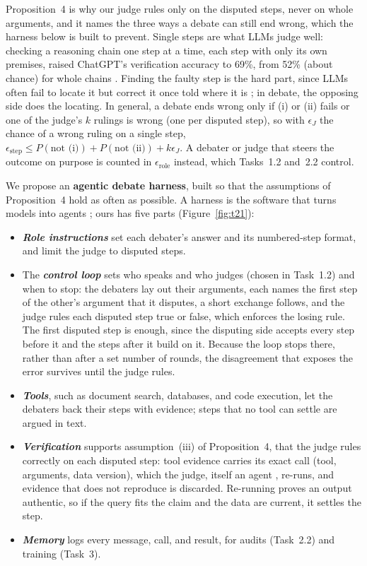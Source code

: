 \documentclass[12pt,letterpaper]{article}
\newcommand{\slab}[1]{\textbf{\textit{#1}}}
\begin{document}
Proposition~4 is why our judge rules only on the disputed steps, never on whole arguments, and it names the three ways a debate can still end wrong, which the harness below is built to prevent. Single steps are what LLMs judge well: checking a reasoning chain one step at a time, each step with only its own premises, raised ChatGPT's verification accuracy to 69\%, from 52\% (about chance) for whole chains \citep{ling2023deductive}. Finding the faulty step is the hard part, since LLMs often fail to locate it but correct it once told where it is \citep{tyen2024llms}; in debate, the opposing side does the locating. In general, a debate ends wrong only if (i) or (ii) fails or one of the judge's $k$ rulings is wrong (one per disputed step), so with $\epsilon_J$ the chance of a wrong ruling on a single step, $\epsilon_{\text{step}}\le P(\text{not (i)})+P(\text{not (ii)})+k\epsilon_J$. A debater or judge that steers the outcome on purpose is counted in $\epsilon_{\text{role}}$ instead, which Tasks~1.2 and~2.2 control.

We propose an \textbf{agentic debate harness}, built so that the assumptions of Proposition~4 hold as often as possible. A harness is the software that turns models into agents \citep{ning2026harness,zhang2026harness,yao2023react,yang2024sweagent}; ours has five parts (Figure~\ref{fig:t21}):
\begin{itemize}
\item \slab{Role instructions} set each debater's answer and its numbered-step format, and limit the judge to disputed steps.
\item The \slab{control loop} sets who speaks and who judges (chosen in Task~1.2) and when to stop: the debaters lay out their arguments, each names the first step of the other's argument that it disputes, a short exchange follows, and the judge rules each disputed step true or false, which enforces the losing rule. The first disputed step is enough, since the disputing side accepts every step before it and the steps after it build on it. Because the loop stops there, rather than after a set number of rounds, the disagreement that exposes the error survives until the judge rules.
\item \slab{Tools}, such as document search, databases, and code execution, let the debaters back their steps with evidence; steps that no tool can settle are argued in text.
\item \slab{Verification} supports assumption~(iii) of Proposition~4, that the judge rules correctly on each disputed step: tool evidence carries its exact call (tool, arguments, data version), which the judge, itself an agent \citep{zhuge2025agent}, re-runs, and evidence that does not reproduce is discarded. Re-running proves an output authentic, so if the query fits the claim and the data are current, it settles the step.
\item \slab{Memory} logs every message, call, and result, for audits (Task~2.2) and training (Task~3).
\end{itemize}
\end{document}
